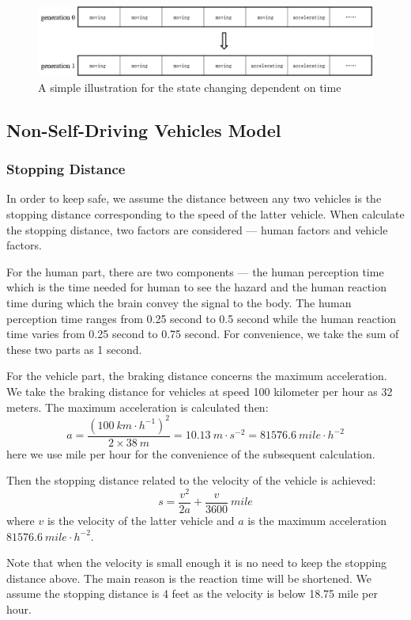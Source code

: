 \documentclass[a4paper]{article}
\begin{document}
	\begin{figure}[H]
		\centering
		\includegraphics[scale=0.5]{generation}
		\caption{A simple illustration for the state changing dependent on time}
		\label{generation}
	\end{figure}



	\subsection{Non-Self-Driving Vehicles Model}
	\subsubsection{Stopping Distance}
	In order to keep safe, we assume the distance between any two vehicles is the stopping distance corresponding to the speed of the latter vehicle. When calculate the stopping distance, two factors are considered — human factors and vehicle factors.


	For the human part, there are two components — the human perception time which is the time needed for human to see the hazard and the human reaction time during which the brain convey the signal to the body. The human perception time ranges from 0.25 second to 0.5 second while the human reaction time varies from 0.25 second to 0.75 second.\cite{stopping} For convenience, we take the sum of these two parts as 1 second.

	For the vehicle part, the braking distance concerns the maximum acceleration. We take the braking distance for vehicles at speed 100 kilometer per hour as 32 meters. The maximum acceleration is calculated then:
	$$ a=\dfrac{(100\ km\cdot h^{-1})^2}{2\times 38\ m}=10.13\ m\cdot s^{-2}=81576.6\ mile\cdot h^{-2} $$
	here we use mile per hour for the convenience of the subsequent calculation.

	Then the stopping distance related to the velocity of the vehicle is achieved:
	$$ s=\dfrac{v^2}{2a}+\dfrac{v}{3600}\ mile $$
	where $ v $ is the velocity of the latter vehicle and $ a $ is the maximum acceleration $ 81576.6\ mile\cdot h^{-2} $.

	Note that when the velocity is small enough it is no need to keep the stopping distance above. The main reason is the reaction time will be shortened. We assume the stopping distance is 4 feet as the velocity is below 18.75 mile per hour.
\end{document}

